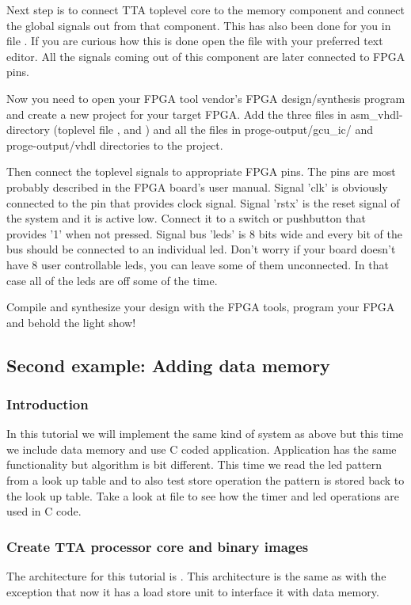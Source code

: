 \documentclass[twoside]{tceusermanual}
\begin{document}
Next step is to connect TTA toplevel core to the memory component and connect
the global signals out from that component. This has also been done for you in
file . If you are curious how this is done
open the file with your preferred text editor. All the signals coming out of
this component are later connected to FPGA pins.

Now you need to open your FPGA tool vendor's FPGA design/synthesis program and
create a new project for your target FPGA. Add the three files in 
asm\_vhdl-directory (toplevel file , 
 and ) and all the
files in proge-output/gcu\_ic/ and proge-output/vhdl directories to the
project.

Then connect the toplevel signals to appropriate FPGA pins. The pins are most
probably described in the FPGA board's user manual. Signal 'clk' is obviously
connected to the pin that provides clock signal. Signal 'rstx' is the reset
signal of the system and it is active low. Connect it to a switch or
pushbutton that provides '1' when not pressed. Signal bus 'leds' is 8 bits
wide and every bit of the bus should be connected to an individual led. Don't
worry if your board doesn't have 8 user controllable leds, you can leave some
of them unconnected. In that case all of the leds are off some of the time.

Compile and synthesize your design with the FPGA tools, program your FPGA and
behold the light show!

\subsection{Second example: Adding data memory}
\subsubsection{Introduction}
In this tutorial we will implement the same kind of system as above but this
time we include data memory and use C coded application. Application has
the same functionality but algorithm is bit different. This time we read the
led pattern from a look up table and to also test store operation the pattern
is stored back to the look up table. Take a look at file 
to see how the timer and led operations are used in C code.

\subsubsection{Create TTA processor core and binary images}
The architecture for this tutorial is . This architecture
is the same as  with the exception that now it has a load
store unit to interface it with data memory.
\end{document}
